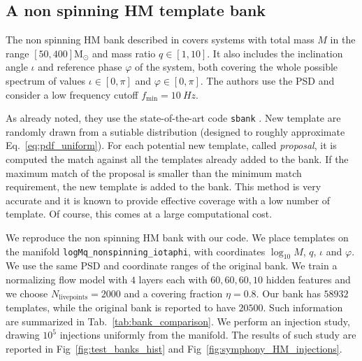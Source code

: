 \documentclass[twocolumn,showpacs,preprintnumbers,nofootinbib,prd,
superscriptaddress,10pt]{revtex4-2}
\begin{document}


\subsection{A non spinning HM template bank} \label{sec:HM_comparison}

The non spinning HM bank described in \cite{Harry:2017weg} covers systems with total mass $M$ in the range $[50, 400] \mathrm{M_\odot}$ and mass ratio $q\in [1,10]$. It also includes the inclination angle $\iota$ and reference phase $\varphi$ of the system, both covering the whole possible spectrum of values $\iota\in [0,\pi]$ and $\varphi\in [0,\pi]$.
The authors use the PSD \cite{} and consider a low frequency cutoff $f_\text{min} = \SI{10}{Hz}$.

As already noted, they use the state-of-the-art code \texttt{sbank} \cite{Ajith:2012mn, PhysRevD.80.104014}. New template are randomly drawn from a sutiable distribution (designed to roughly approximate Eq.~\eqref{eq:pdf_uniform}). For each potential new template, called {\it proposal}, it is computed the match against all the templates already added to the bank. If the maximum match of the proposal is smaller than the minimum match requirement, the new template is added to the bank. This method is very accurate and it is known to provide effective coverage with a low number of template. Of course, this comes at a large computational cost.

We reproduce the non spinning HM bank with our code. We place templates on the manifold \texttt{logMq\_nonspinning\_iotaphi}, with coordinates $\log_{10}M$, $q$, $\iota$ and $\varphi$. We use the same PSD and coordinate ranges of the original bank.
We train a normalizing flow model with $4$ layers each with $60, 60, 60, 10$ hidden features and we choose $N_\text{livepoints} = 2000$ and a covering fraction $\eta = 0.8$.
Our bank has $58932$ templates, while the original bank is reported to have $20500$.
Such information are summarized in Tab.~\ref{tab:bank_comparison}.
We perform an injection study, drawing $10^5$ injections uniformly from the manifold. The results of such study are reported in Fig~\ref{fig:test_banks_hist} and Fig~\ref{fig:symphony_HM_injections}.
\end{document}
